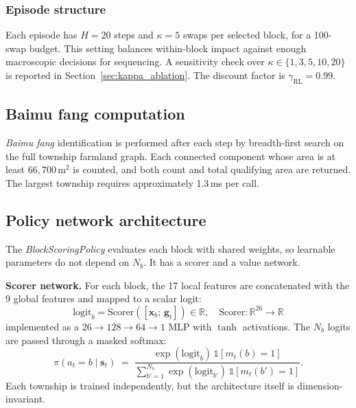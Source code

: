 \documentclass[preprint,12pt]{elsarticle}
\begin{document}
\subsubsection{Episode structure}

Each episode has $H=20$ steps and $\kappa=5$ swaps per selected block, for a 100-swap budget. This setting balances within-block impact against enough macroscopic decisions for sequencing. A sensitivity check over $\kappa\in\{1,3,5,10,20\}$ is reported in Section~\ref{sec:kappa_ablation}. The discount factor is $\gamma_{\text{RL}}=0.99$.

\subsection{Baimu fang computation}
\label{sec:baimu}

\textit{Baimu fang} identification is performed after each step by breadth-first search on the full township farmland graph. Each connected component whose area is at least $66{,}700$\,m$^2$ is counted, and both count and total qualifying area are returned. The largest township requires approximately 1.3\,ms per call.

\subsection{Policy network architecture}
\label{sec:policy}

The \textit{BlockScoringPolicy} evaluates each block with shared weights, so learnable parameters do not depend on $N_b$. It has a scorer and a value network.

\textbf{Scorer network.} For each block, the 17 local features are concatenated with the 9 global features and mapped to a scalar logit:
\begin{equation}
\text{logit}_b = \text{Scorer}\!\left([\mathbf{x}_b;\, \mathbf{g}_t]\right) \in \mathbb{R}, \quad \text{Scorer}: \mathbb{R}^{26} \to \mathbb{R}
\end{equation}
implemented as a $26\to128\to64\to1$ MLP with $\tanh$ activations. The $N_b$ logits are passed through a masked softmax:
\begin{equation}
\pi(a_t = b \mid \mathbf{s}_t) \;=\; \frac{\exp(\text{logit}_b)\,\mathbb{1}[m_t(b)=1]}{\sum_{b'=1}^{N_b}\exp(\text{logit}_{b'})\,\mathbb{1}[m_t(b')=1]}.
\end{equation}
Each township is trained independently, but the architecture itself is dimension-invariant.
\end{document}
